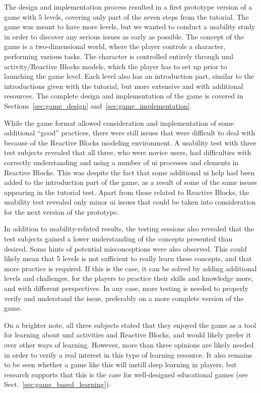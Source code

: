 \noindent
The design and implementation process resulted in a first prototype version of a game with 5 levels, covering only part of the seven steps from the tutorial. The game was meant to have more levels, but we wanted to conduct a usability study in order to discover any serious issues as early as possible. The concept of the game is a two-dimensional world, where the player controls a character, performing various tasks. The character is controlled entirely through \gls{uml} activity/Reactive Blocks models, which the player has to set up prior to launching the game level. Each level also has an introduction part, similar to the introductions given with the tutorial, but more extensive and with additional resources. The complete design and implementation of the game is covered in Sections~\ref{sec:game_design} and~\ref{sec:game_implementation}.

\noindent
While the game format allowed consideration and implementation of some additional ``good'' practices, there were still issues that were difficult to deal with because of the Reactive Blocks modeling environment. A usability test with three test subjects revealed that all three, who were novice users, had difficulties with correctly understanding and using a number of \gls{ui} processes and elements in Reactive Blocks. This was despite the fact that some additional \gls{ui} help had been added to the introduction part of the game, as a result of some of the same issues appearing in the tutorial test. Apart from those related to Reactive Blocks, the usability test revealed only minor \gls{ui} issues that could be taken into consideration for the next version of the prototype.

\noindent
In addition to usability-related results, the testing sessions also revealed that the test subjects gained a lower understanding of the concepts presented than desired. Some hints of potential misconceptions were also observed. This could likely mean that 5 levels is not sufficient to really learn these concepts, and that more practice is required. If this is the case, it can be solved by adding additional levels and challenges, for the players to practice their skills and knowledge more, and with different perspectives. In any case, more testing is needed to properly verify and understand the issue, preferably on a more complete version of the game.

\noindent
On a brighter note, all three subjects stated that they enjoyed the game as a tool for learning about \gls{uml} activities and Reactive Blocks, and would likely prefer it over other ways of learning. However, more than three opinions are likely needed in order to verify a real interest in this type of learning resource. It also remains to be seen whether a game like this will instill deep learning in players, but research supports that this is the case for well-designed educational games (see Sect.~\ref{sec:game_based_learning}).

